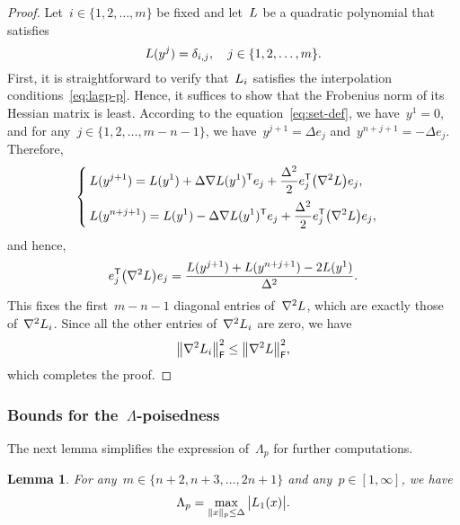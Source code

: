 \documentclass{article}
\numberwithin{equation}{section}
\theoremstyle{definition}
\theoremstyle{plain}
\newtheorem{lemma}{Lemma}[section]
\theoremstyle{remark}
\newcommand*{\abs}[2][]{#1\lvert#2#1\rvert}
\newcommand*{\lagp}[1][]{L\ifblank{#1}{}{_{#1}}}
\newcommand*{\norm}[2][]{#1\lVert#2#1\rVert}
\newcommand*{\set}[2][]{#1\{#2#1\}}
\newcommand*{\T}{\mathsf{T}}
\begin{document}
\begin{proof}
    Let~$i \in \set{1, 2, \dots, m}$ be fixed and let~$\lagp$ be a quadratic polynomial that satisfies
    \begin{equation}
        \label{eq:lagp-p}
        \lagp(y^j) = \delta_{i, j}, \quad j \in \set{1, 2, \dots, m}.
    \end{equation}
    First, it is straightforward to verify that~$\lagp[i]$ satisfies the interpolation conditions~\eqref{eq:lagp-p}.
    Hence, it suffices to show that the Frobenius norm of its Hessian matrix is least.
    According to the equation~\eqref{eq:set-def}, we have~$y^1 = 0$, and for any~$j \in \set{1, 2, \dots, m - n - 1}$, we have~$y^{j + 1} = \Delta e_j$ and~$y^{n + j + 1} = -\Delta e_j$.
    Therefore,
    \begin{equation*}
        \begin{cases}
            \displaystyle \lagp(y^{j + 1}) = \lagp(y^1) + \Delta \nabla \lagp(y^1)^{\T} e_j + \frac{\Delta^2}{2} e_j^{\T} \big(\nabla^2 \lagp \big) e_j,\\[2ex]
            \displaystyle \lagp(y^{n + j + 1}) = \lagp(y^1) - \Delta \nabla \lagp(y^1)^{\T} e_j + \frac{\Delta^2}{2} e_j^{\T} \big(\nabla^2 \lagp \big) e_j,
        \end{cases}
    \end{equation*}
    and hence,
    \begin{equation*}
        e_j^{\T} \big(\nabla^2 \lagp \big) e_j = \frac{\lagp(y^{j + 1}) + \lagp(y^{n + j + 1}) - 2 \lagp(y^1)}{\Delta^2}.
    \end{equation*}
    This fixes the first~$m - n - 1$ diagonal entries of~$\nabla^2 \lagp$, which are exactly those of~$\nabla^2 \lagp[i]$.
    Since all the other entries of~$\nabla^2 \lagp[i]$ are zero, we have
    \begin{equation*}
        \norm[\big]{\nabla^2 \lagp[i]}_{\mathsf{F}}^2 \le \norm[\big]{\nabla^2 \lagp}_{\mathsf{F}}^2,
    \end{equation*}
    which completes the proof.
\end{proof}

\subsubsection{Bounds for the~\texorpdfstring{$\Lambda$}{\textLambda}-poisedness}

The next lemma simplifies the expression of~$\Lambda_p$ for further computations.

\begin{lemma}
    \label{lem:lambda-p}
    For any~$m \in \set{n + 2, n + 3, \dots, 2n + 1}$ and any~$p \in [1, \infty]$, we have
    \begin{equation}
        \label{eq:lambda-p}
        \Lambda_p = \max_{\norm{x}_p \le \Delta} \abs[\big]{\lagp[1](x)}.
    \end{equation}
\end{lemma}
\end{document}
